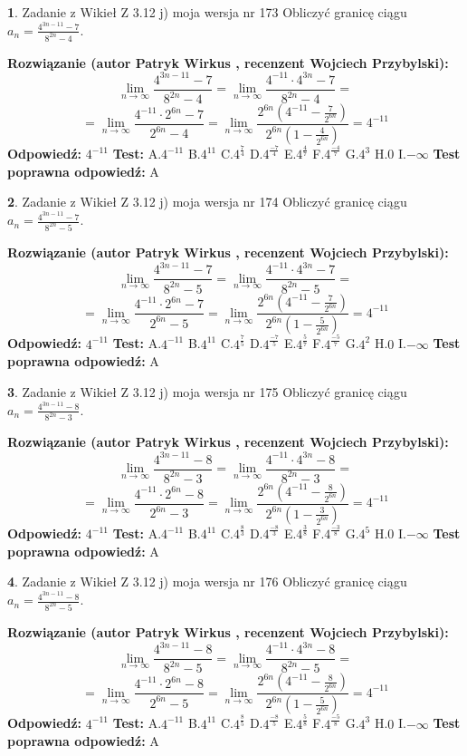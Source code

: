 \documentclass[12pt, a4paper]{article}
\theoremstyle{definition} %
\newtheorem{zad}{}
\newcommand{\zadStart}[1]{\begin{zad}#1\newline}
\newcommand{\zadStop}{\end{zad}}
\newcommand{\rozwStart}[2]{\noindent \textbf{Rozwiązanie (autor #1 , recenzent #2): }\newline}
\newcommand{\rozwStop}{\newline}
\newcommand{\odpStart}{\noindent \textbf{Odpowiedź:}\newline}
\newcommand{\odpStop}{\newline}
\newcommand{\testStart}{\noindent \textbf{Test:}\newline}
\newcommand{\testStop}{\newline}
\newcommand{\kluczStart}{\noindent \textbf{Test poprawna odpowiedź:}\newline}
\newcommand{\kluczStop}{\newline}
\begin{document}
\zadStart{Zadanie z Wikieł Z 3.12 j) moja wersja nr 173}
Obliczyć granicę ciągu $a_{n}=\frac{4^{3n-11}-7}{8^{2n}-4}$.
\zadStop
\rozwStart{Patryk Wirkus}{Wojciech Przybylski}
$$\lim\limits_{n\to\infty}\frac{4^{3n-11}-7}{8^{2n}-4}= \lim\limits_{n\to\infty}\frac{4^{-11} \cdot 4^{3n}-7}{8^{2n}-4}=$$
$$= \lim\limits_{n\to\infty}\frac{4^{-11} \cdot 2^{6n}-7}{2^{6n}-4}= \lim\limits_{n\to\infty}\frac{2^{6n}(4^{-11} - \frac{7}{2^{6n}})}{2^{6n}(1-\frac{4}{2^{6n}})}= 4^{-11}$$
\rozwStop
\odpStart
$4^{-11}$
\odpStop
\testStart
A.$4^{-11}$
B.$4^{11}$
C.$4^{\frac{7}{4}}$
D.$4^{\frac{-7}{4}}$
E.$4^{\frac{4}{7}}$
F.$4^{\frac{-4}{7}}$
G.$4^{3}$
H.$0$
I.$-\infty$
\testStop
\kluczStart
A
\kluczStop



\zadStart{Zadanie z Wikieł Z 3.12 j) moja wersja nr 174}
Obliczyć granicę ciągu $a_{n}=\frac{4^{3n-11}-7}{8^{2n}-5}$.
\zadStop
\rozwStart{Patryk Wirkus}{Wojciech Przybylski}
$$\lim\limits_{n\to\infty}\frac{4^{3n-11}-7}{8^{2n}-5}= \lim\limits_{n\to\infty}\frac{4^{-11} \cdot 4^{3n}-7}{8^{2n}-5}=$$
$$= \lim\limits_{n\to\infty}\frac{4^{-11} \cdot 2^{6n}-7}{2^{6n}-5}= \lim\limits_{n\to\infty}\frac{2^{6n}(4^{-11} - \frac{7}{2^{6n}})}{2^{6n}(1-\frac{5}{2^{6n}})}= 4^{-11}$$
\rozwStop
\odpStart
$4^{-11}$
\odpStop
\testStart
A.$4^{-11}$
B.$4^{11}$
C.$4^{\frac{7}{5}}$
D.$4^{\frac{-7}{5}}$
E.$4^{\frac{5}{7}}$
F.$4^{\frac{-5}{7}}$
G.$4^{2}$
H.$0$
I.$-\infty$
\testStop
\kluczStart
A
\kluczStop



\zadStart{Zadanie z Wikieł Z 3.12 j) moja wersja nr 175}
Obliczyć granicę ciągu $a_{n}=\frac{4^{3n-11}-8}{8^{2n}-3}$.
\zadStop
\rozwStart{Patryk Wirkus}{Wojciech Przybylski}
$$\lim\limits_{n\to\infty}\frac{4^{3n-11}-8}{8^{2n}-3}= \lim\limits_{n\to\infty}\frac{4^{-11} \cdot 4^{3n}-8}{8^{2n}-3}=$$
$$= \lim\limits_{n\to\infty}\frac{4^{-11} \cdot 2^{6n}-8}{2^{6n}-3}= \lim\limits_{n\to\infty}\frac{2^{6n}(4^{-11} - \frac{8}{2^{6n}})}{2^{6n}(1-\frac{3}{2^{6n}})}= 4^{-11}$$
\rozwStop
\odpStart
$4^{-11}$
\odpStop
\testStart
A.$4^{-11}$
B.$4^{11}$
C.$4^{\frac{8}{3}}$
D.$4^{\frac{-8}{3}}$
E.$4^{\frac{3}{8}}$
F.$4^{\frac{-3}{8}}$
G.$4^{5}$
H.$0$
I.$-\infty$
\testStop
\kluczStart
A
\kluczStop



\zadStart{Zadanie z Wikieł Z 3.12 j) moja wersja nr 176}
Obliczyć granicę ciągu $a_{n}=\frac{4^{3n-11}-8}{8^{2n}-5}$.
\zadStop
\rozwStart{Patryk Wirkus}{Wojciech Przybylski}
$$\lim\limits_{n\to\infty}\frac{4^{3n-11}-8}{8^{2n}-5}= \lim\limits_{n\to\infty}\frac{4^{-11} \cdot 4^{3n}-8}{8^{2n}-5}=$$
$$= \lim\limits_{n\to\infty}\frac{4^{-11} \cdot 2^{6n}-8}{2^{6n}-5}= \lim\limits_{n\to\infty}\frac{2^{6n}(4^{-11} - \frac{8}{2^{6n}})}{2^{6n}(1-\frac{5}{2^{6n}})}= 4^{-11}$$
\rozwStop
\odpStart
$4^{-11}$
\odpStop
\testStart
A.$4^{-11}$
B.$4^{11}$
C.$4^{\frac{8}{5}}$
D.$4^{\frac{-8}{5}}$
E.$4^{\frac{5}{8}}$
F.$4^{\frac{-5}{8}}$
G.$4^{3}$
H.$0$
I.$-\infty$
\testStop
\kluczStart
A
\kluczStop
\end{document}
